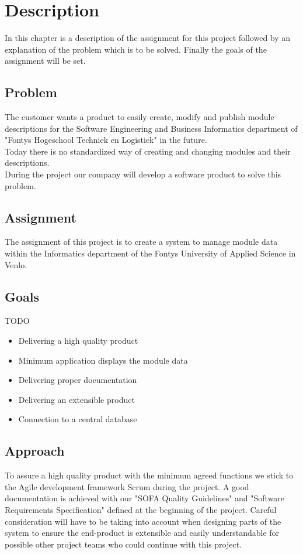 \chapter{Description}
In this chapter is a description of the assignment for this project followed by an explanation 
of the problem which is to be solved. Finally the goals of the assignment will be set.

\section{Problem}
The customer wants a product to easily create, modify and publish module descriptions
for the Software Engineering and Business Informatics department of "Fontys Hogeschool Techniek en Logistiek" in the future.
\newline \\
Today there is no standardized way of creating and changing modules and their descriptions.
\newline \\
During the project our company will develop a software product to solve this problem.

\section{Assignment}
The assignment of this project is to create a system to manage module data within the Informatics
department of the Fontys University of Applied Science in Venlo. 

\newpage

\section{Goals}
TODO
\begin{itemize}
    \item Delivering a high quality product
    \item Minimum application displays the module data 
    \item Delivering proper documentation
    \item Delivering an extensible product
    \item Connection to a central database
\end{itemize}

\section{Approach}
To assure a high quality product with the minimum agreed functions we stick to the Agile development framework Scrum during the project.
A good documentation is achieved with our "SOFA Quality Guidelines" and "Software Requirements Specification" defined at the beginning of the project.
Careful consideration will have to be taking into account when designing parts of the system to ensure the end-product is extensible and easily understandable for possible other project teams who could continue with this project.


